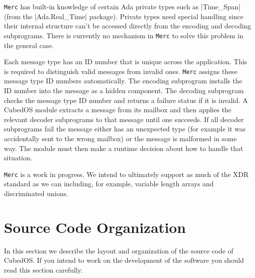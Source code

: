 \texttt{Merc} has built-in knowledge of certain Ada private types such as |Time_Span| (from the
|Ada.Real_Time| package). Private types need special handling since their internal structure
can't be accessed directly from the encoding and decoding subprograms. There is currently no
mechanism in \texttt{Merc} to solve this problem in the general case.

Each message type has an ID number that is unique across the application. This is required to
distinguish valid messages from invalid ones. \texttt{Merc} assigns these message type ID
numbers automatically. The encoding subprogram installs the ID number into the message as a
hidden component. The decoding subprogram checks the message type ID number and returns a
failure status if it is invalid. A CubedOS module extracts a message from its mailbox and then
applies the relevant decoder subprograms to that message until one succeeds. If all decoder
subprograms fail the message either has an unexpected type (for example it was accidentally sent
to the wrong mailbox) or the message is malformed in some way. The module must then make a
runtime decision about how to handle that situation.

\texttt{Merc} is a work in progress. We intend to ultimately support as much of the XDR standard
as we can including, for example, variable length arrays and discriminated unions.

\section{Source Code Organization}
\label{sec:code-organization}

In this section we describe the layout and organization of the source code of CubedOS. If you
intend to work on the development of the software you should read this section carefully.

